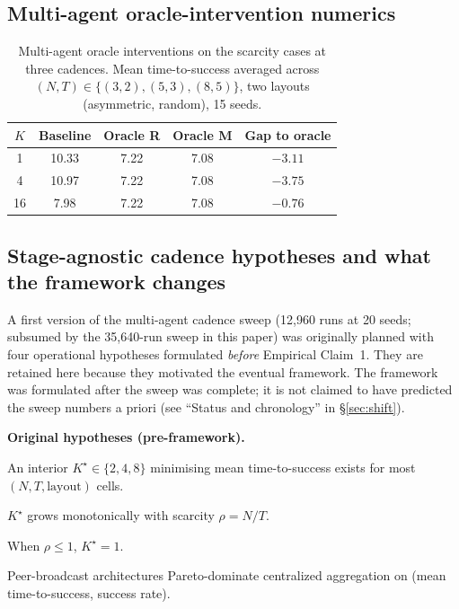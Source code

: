 \documentclass{article}
\begin{document}
\subsection{Multi-agent oracle-intervention numerics}
\label{app:multi-oracle}

\begin{table}[h]
\caption{Multi-agent oracle interventions on the scarcity cases at three cadences. Mean time-to-success averaged across $(N,T)\in\{(3,2),(5,3),(8,5)\}$, two layouts (asymmetric, random), 15 seeds.}
\label{tab:multi-agent-oracle}
\centering
\small
\begin{tabular}{c c c c c}
\toprule
$K$ & Baseline & Oracle R & Oracle M & Gap to oracle \\
\midrule
1  & 10.33 & 7.22 & 7.08 & $-3.11$ \\
4  & 10.97 & 7.22 & 7.08 & $-3.75$ \\
16 &  7.98 & 7.22 & 7.08 & $-0.76$ \\
\bottomrule
\end{tabular}
\end{table}

\subsection{Stage-agnostic cadence hypotheses and what the framework changes}
\label{app:standalone-hypotheses}

A first version of the multi-agent cadence sweep (12{,}960 runs at 20 seeds; subsumed by the 35{,}640-run sweep in this paper) was originally planned with four operational hypotheses formulated \emph{before} Empirical Claim~1. They are retained here because they motivated the eventual framework. The framework was formulated after the sweep was complete; it is not claimed to have predicted the sweep numbers a priori (see ``Status and chronology'' in \S\ref{sec:shift}).

\textbf{Original hypotheses (pre-framework).}
\begin{description}[leftmargin=10pt,topsep=2pt,itemsep=1pt]
\item[H1.] An interior $K^\star \in \{2,4,8\}$ minimising mean time-to-success exists for most $(N, T, \text{layout})$ cells.
\item[H2.] $K^\star$ grows monotonically with scarcity $\rho = N/T$.
\item[H3.] When $\rho \le 1$, $K^\star = 1$.
\item[H4.] Peer-broadcast architectures Pareto-dominate centralized aggregation on (mean time-to-success, success rate).
\end{description}
\end{document}

